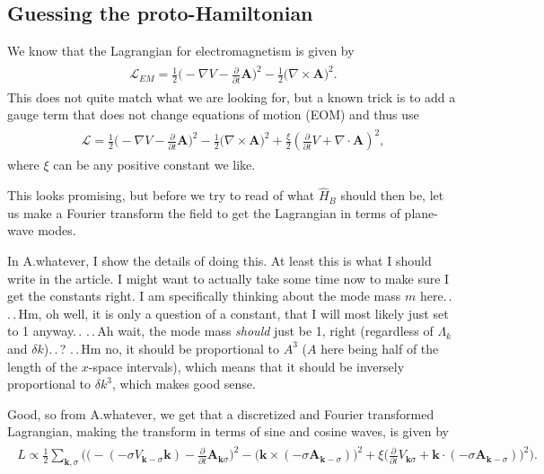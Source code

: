 \documentclass{report}
\begin{document}
\subsection[proto-Hamiltonian]{Guessing the proto-Hamiltonian}
We know that the Lagrangian for electromagnetism is given by
\begin{align}
\begin{aligned}
	\mathcal{L}_{EM} = 
		\frac{1}{2}\big(-\nabla V - \frac{\partial}{\partial t} \boldsymbol A	\big)^2 - 
		\frac{1}{2}\big(\nabla \times \boldsymbol A\big)^2.
\end{aligned} 
\end{align}
This does not quite match what we are looking for, but a known trick is to add a gauge term that does not change equations of motion (EOM) and thus use 
\begin{align}
\begin{aligned}
	\mathcal{L} = 
		\frac{1}{2}\big(-\nabla V - \frac{\partial}{\partial t} \boldsymbol A	\big)^2 - 
		\frac{1}{2}\big(\nabla \times \boldsymbol A\big)^2 +
		\frac{\xi}{2} (\frac{\partial}{\partial t} V+\nabla \cdot \boldsymbol A)^2,
\end{aligned} 
\end{align}
where $\xi$ can be any positive constant we like.

This looks promising, but before we try to read of what $\hat H_B$ should then be, let us make a Fourier transform the field to get the Lagrangian in terms of plane-wave modes. 

In A.whatever, I show the details of doing this. At least this is what I should write in the article. I might want to actually take some time now to make sure I get the constants right. I am specifically thinking about the mode mass $m$ here.\,. .\,.\,Hm, oh well, it is only a question of a constant, that I will most likely just set to 1 anyway.\,. .\,.\,Ah wait, the mode mass \emph{should} just be 1, right (regardless of $\Lambda_k$ and $\delta k$).\,.\,? .\,.\,Hm no, it should be proportional to $A^3$ ($A$ here being half of the length of the $x$-space intervals), which means that it should be inversely proportional to $\delta k^3$, which makes good sense. 

Good, so from A.whatever, we get that a discretized and Fourier transformed Lagrangian, making the transform in terms of sine and cosine waves, is given by 
\begin{align}
\begin{aligned}
	L \propto \frac{1}{2}\sum_{\boldsymbol k, \sigma}
	\big(\big(-(-\sigma  V_{\boldsymbol k -\sigma}\boldsymbol k)-\frac{\partial}{\partial t} {\boldsymbol A}_{\boldsymbol k \sigma} \big)^2-\big(\boldsymbol k \times (-\sigma {\boldsymbol A}_{\boldsymbol k -\sigma}) \big)^2
	+ \xi \big(\frac{\partial}{\partial t}  V_{\boldsymbol k \sigma} +\boldsymbol k \cdot (-\sigma{\boldsymbol A}_{\boldsymbol k -\sigma})\big)^2\big).
\end{aligned} 
\end{align}
\end{document}
